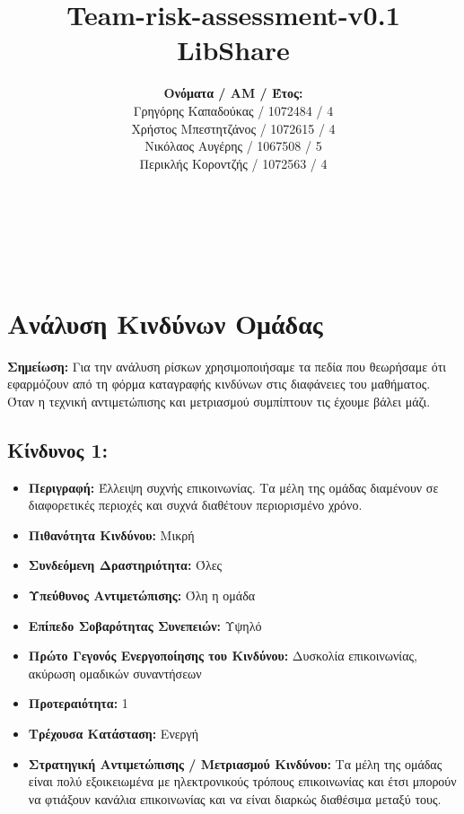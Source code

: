 \documentclass[12pt,a4paper]{article}
\title{Team-risk-assessment-v0.1\\ LibShare}
\author{\textbf{Ονόματα / ΑΜ / Έτος:} \\ Γρηγόρης Καπαδούκας / 1072484 / 4\textdegree \\ Χρήστος Μπεστητζάνος / 1072615 / 4\textdegree \\ Νικόλαος Αυγέρης / 1067508 / 5\textdegree \\ Περικλής Κοροντζής / 1072563 / 4\textdegree}
\begin{document}
\makeatletter
\begin{center}
	\LARGE{\@title} \\
	\pagebreak
\end{center}
\begin{LARGE}\@author\end{LARGE} \\
\pagebreak

\section{Ανάλυση Κινδύνων Ομάδας}

\textbf{Σημείωση:} Για την ανάλυση ρίσκων χρησιμοποιήσαμε τα πεδία που θεωρήσαμε ότι εφαρμόζουν από τη φόρμα καταγραφής κινδύνων στις διαφάνειες του μαθήματος. Όταν η τεχνική αντιμετώπισης και μετριασμού συμπίπτουν τις έχουμε βάλει μάζι.

\subsection*{Κίνδυνος 1:}
\begin{itemize}
	\item \textbf{Περιγραφή:} Έλλειψη συχνής επικοινωνίας. Τα μέλη της ομάδας διαμένουν σε διαφορετικές περιοχές και συχνά διαθέτουν περιορισμένο χρόνο.
	\item \textbf{Πιθανότητα Κινδύνου:} Μικρή
	\item \textbf{Συνδεόμενη Δραστηριότητα:} Όλες
	\item \textbf{Υπεύθυνος Αντιμετώπισης:} Όλη η ομάδα
	\item \textbf{Επίπεδο Σοβαρότητας Συνεπειών:} Υψηλό
	\item \textbf{Πρώτο Γεγονός Ενεργοποίησης του Κινδύνου:} Δυσκολία επικοινωνίας, ακύρωση ομαδικών συναντήσεων
	\item \textbf{Προτεραιότητα:} 1
	\item \textbf{Τρέχουσα Κατάσταση:} Ενεργή
	\item \textbf{Στρατηγική Αντιμετώπισης / Μετριασμού Κινδύνου:} Τα μέλη της ομάδας είναι  πολύ εξοικειωμένα με ηλεκτρονικούς τρόπους επικοινωνίας και έτσι μπορούν να φτιάξουν κανάλια επικοινωνίας και να είναι διαρκώς διαθέσιμα μεταξύ τους. 
\end{itemize}
\end{document}
